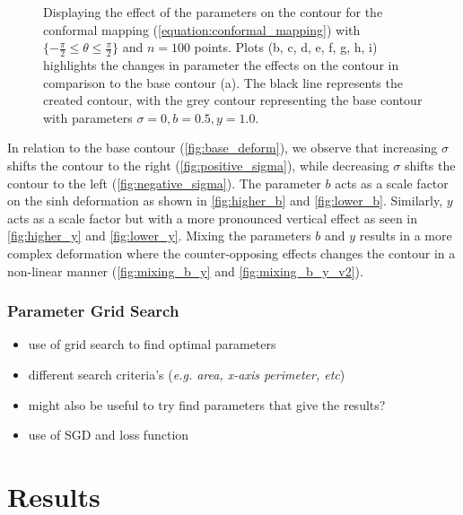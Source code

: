 \documentclass[a4paper]{report}
\begin{document}
\begin{figure}[ht]
    \caption{Displaying the effect of the parameters on the contour for the conformal mapping (\ref{equation:conformal_mapping}) with $\{-\frac{\pi}{2} \leq \theta \leq \frac{\pi}{2} \}$ and $n = 100$ points. Plots (b, c, d, e, f, g, h, i) highlights the changes in parameter the effects on the contour in comparison to the base contour (a). The black line represents the created contour, with the grey contour representing the base contour with parameters $\sigma = 0, b = 0.5, y = 1.0$.}
\end{figure}

In relation to the base contour (\autoref{fig:base_deform}), we observe that increasing $\sigma$ shifts the contour to the right (\autoref{fig:positive_sigma}), while decreasing $\sigma$ shifts the contour to the left (\autoref{fig:negative_sigma}). The parameter $b$ acts as a scale factor on the sinh deformation as shown in \autoref{fig:higher_b} and \ref{fig:lower_b}. Similarly, $y$ acts as a scale factor but with a more pronounced vertical effect as seen in \autoref{fig:higher_y} and \ref{fig:lower_y}. Mixing the parameters $b$ and $y$ results in a more complex deformation where the counter-opposing effects changes the contour in a non-linear manner (\autoref{fig:mixing_b_y} and \ref{fig:mixing_b_y_v2}).


\subsection{Parameter Grid Search}
\begin{itemize}
    \item use of grid search to find optimal parameters
    \item different search criteria's (\textit{e.g. area, x-axis perimeter, etc})
    \item might also be useful to try find parameters that give the results?
    \item use of SGD and loss function
\end{itemize}

\chapter{Results}
\end{document}
